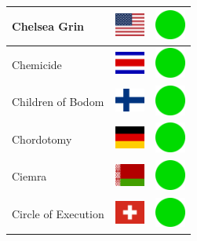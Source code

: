 \documentclass[12pt, a4paper, twoside]{report}
\begin{document}
\begin{center}
\begin{longtable}{|p{5cm}|p{2cm}|p{2cm}|}
 Chelsea Grin                                               & \includegraphics[width=1cm]{../4x3/us} &   \includegraphics[width=1cm]{../likes/y} \\ \hline
 Chemicide                                                  & \includegraphics[width=1cm]{../4x3/cr} &   \includegraphics[width=1cm]{../likes/y} \\ \hline
 Children of Bodom                                          & \includegraphics[width=1cm]{../4x3/fi} &   \includegraphics[width=1cm]{../likes/y} \\ \hline
 Chordotomy                                                 & \includegraphics[width=1cm]{../4x3/de} &   \includegraphics[width=1cm]{../likes/y} \\ \hline
 Ciemra                                                     & \includegraphics[width=1cm]{../4x3/by} &   \includegraphics[width=1cm]{../likes/y} \\ \hline
 Circle of Execution                                        & \includegraphics[width=1cm]{../4x3/ch} &   \includegraphics[width=1cm]{../likes/y} \\ \hline

\end{longtable}
\end{center}
\end{document}
